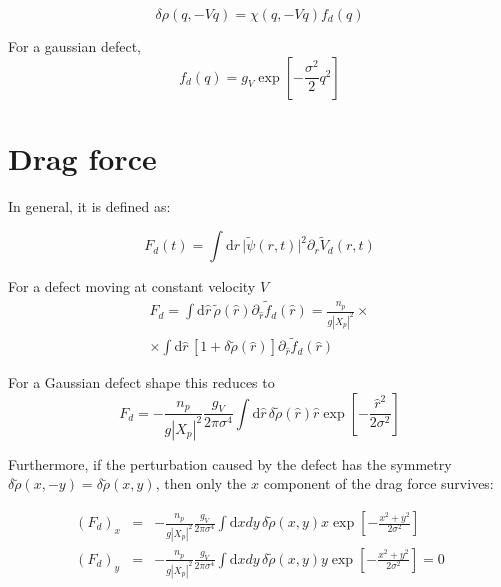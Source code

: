 \documentclass[a4paper,prb,10pt,aps,twocolumn]{revtex4-1}
\begin{document}
\begin{equation}
  \label{eq:57}
  \delta\rho(q,-Vq)=\chi(q,-Vq)f_{d}(q)
\end{equation}

For a gaussian defect,
\begin{equation}
  \label{eq:58}
  f_{d}(q) = g_V \exp\left[-\frac{\sigma^{2}}{2}q^{2}\right]
\end{equation}


\section{Drag force}


In general, it is defined as:

\begin{equation}
  \label{eq:59}
 F_{d}(t)=\int\mathrm{d}r\,\vert\tilde{\psi}(r,t)\vert^{2}\partial_{r}\tilde{V}_{d}(r,t) 
\end{equation}
 

For a defect moving at constant velocity $V$
\begin{multline}
  \label{eq:60}
F_{d}=\int\mathrm{d}\hat{r}\,\tilde{\rho}(\hat{r})\partial_{\hat{r}}\tilde{f}_{d}(\hat{r}) =\frac{n_{p}}{g\left|X_{p}\right|^{2}}\times\\\times
\int\mathrm{d}\hat{r}\,\left[1+\delta\tilde{\rho}(\hat{r})\right]\partial_{\hat{r}}\tilde{f}_{d}(\hat{r})  
\end{multline}


For a Gaussian defect shape this reduces to
\begin{equation}
  \label{eq:61}
F_{d}=-\frac{n_{p}}{g\left|X_{p}\right|^{2}}\frac{g_{V}}{2\pi\sigma^{4}}\int\mathrm{d}\hat{r}\,\delta\tilde{\rho}(\hat{r})\hat{r}\exp\left[-\frac{\hat{r}^{2}}{2\sigma^{2}}\right]  
\end{equation}


Furthermore, if the perturbation caused by the defect has the symmetry
$\delta\tilde{\rho}(x,-y)=\delta\tilde{\rho}(x,y)$, then only the
$x$ component of the drag force survives:

\begin{subequations}
  \begin{eqnarray}
    \label{eq:111}
\left(F_{d}\right)_{x}&=&-\frac{n_{p}}{g\left|X_{p}\right|^{2}}\frac{g_{V}}{2\pi\sigma^{4}}\int\mathrm{d}xdy\,\delta\tilde{\rho}(x,y)x\exp\left[-\frac{x^{2}+y^{2}}{2\sigma^{2}}\right]\\
\left(F_{d}\right)_{y}&=&-\frac{n_{p}}{g\left|X_{p}\right|^{2}}\frac{g_{V}}{2\pi\sigma^{4}}\int\mathrm{d}xdy\,\delta\tilde{\rho}(x,y)y\exp\left[-\frac{x^{2}+y^{2}}{2\sigma^{2}}\right]=0  
  \end{eqnarray}
\end{subequations}
\end{document}
